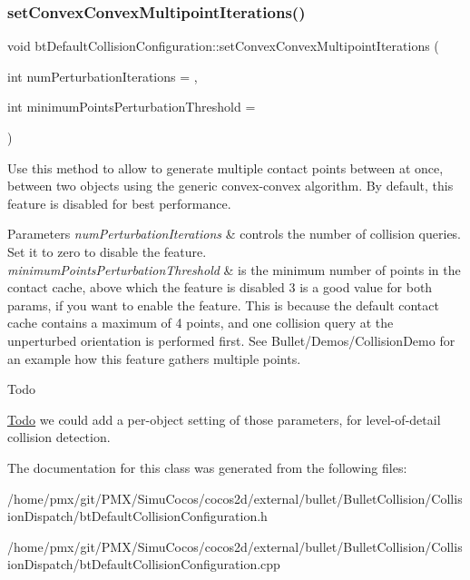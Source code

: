 \subsubsection{\texorpdfstring{set\+Convex\+Convex\+Multipoint\+Iterations()}{setConvexConvexMultipointIterations()}\hspace{0.1cm}{\footnotesize\ttfamily [2/2]}}
{\footnotesize\ttfamily void bt\+Default\+Collision\+Configuration\+::set\+Convex\+Convex\+Multipoint\+Iterations (\begin{DoxyParamCaption}\item[{int}]{num\+Perturbation\+Iterations = {},  }\item[{int}]{minimum\+Points\+Perturbation\+Threshold = {} }\end{DoxyParamCaption})}

Use this method to allow to generate multiple contact points between at once, between two objects using the generic convex-\/convex algorithm. By default, this feature is disabled for best performance. 
\begin{DoxyParams}{Parameters}
{\em num\+Perturbation\+Iterations} & controls the number of collision queries. Set it to zero to disable the feature. \\
\hline
{\em minimum\+Points\+Perturbation\+Threshold} & is the minimum number of points in the contact cache, above which the feature is disabled 3 is a good value for both params, if you want to enable the feature. This is because the default contact cache contains a maximum of 4 points, and one collision query at the unperturbed orientation is performed first. See Bullet/\+Demos/\+Collision\+Demo for an example how this feature gathers multiple points. \\
\hline
\end{DoxyParams}
\begin{DoxyRefDesc}{Todo}
\item[\hyperlink{todo__todo000013}{Todo}]we could add a per-\/object setting of those parameters, for level-\/of-\/detail collision detection. \end{DoxyRefDesc}


The documentation for this class was generated from the following files\+:\begin{DoxyCompactItemize}
\item 
/home/pmx/git/\+P\+M\+X/\+Simu\+Cocos/cocos2d/external/bullet/\+Bullet\+Collision/\+Collision\+Dispatch/bt\+Default\+Collision\+Configuration.\+h\item 
/home/pmx/git/\+P\+M\+X/\+Simu\+Cocos/cocos2d/external/bullet/\+Bullet\+Collision/\+Collision\+Dispatch/bt\+Default\+Collision\+Configuration.\+cpp\end{DoxyCompactItemize}
